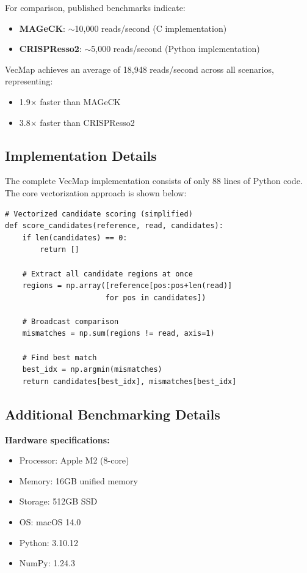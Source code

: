 \documentclass[12pt]{article}
\begin{document}
For comparison, published benchmarks indicate:
\begin{itemize}
\item \textbf{MAGeCK}: $\sim$10,000 reads/second (C implementation)
\item \textbf{CRISPResso2}: $\sim$5,000 reads/second (Python implementation)
\end{itemize}

VecMap achieves an average of 18,948 reads/second across all scenarios, representing:
\begin{itemize}
\item 1.9× faster than MAGeCK
\item 3.8× faster than CRISPResso2
\end{itemize}

\subsection*{Implementation Details}

The complete VecMap implementation consists of only 88 lines of Python code. The core vectorization approach is shown below:

\begin{verbatim}
# Vectorized candidate scoring (simplified)
def score_candidates(reference, read, candidates):
    if len(candidates) == 0:
        return []
    
    # Extract all candidate regions at once
    regions = np.array([reference[pos:pos+len(read)] 
                       for pos in candidates])
    
    # Broadcast comparison
    mismatches = np.sum(regions != read, axis=1)
    
    # Find best match
    best_idx = np.argmin(mismatches)
    return candidates[best_idx], mismatches[best_idx]
\end{verbatim}

\subsection*{Additional Benchmarking Details}

\textbf{Hardware specifications:}
\begin{itemize}
\item Processor: Apple M2 (8-core)
\item Memory: 16GB unified memory
\item Storage: 512GB SSD
\item OS: macOS 14.0
\item Python: 3.10.12
\item NumPy: 1.24.3
\end{itemize}
\end{document}
